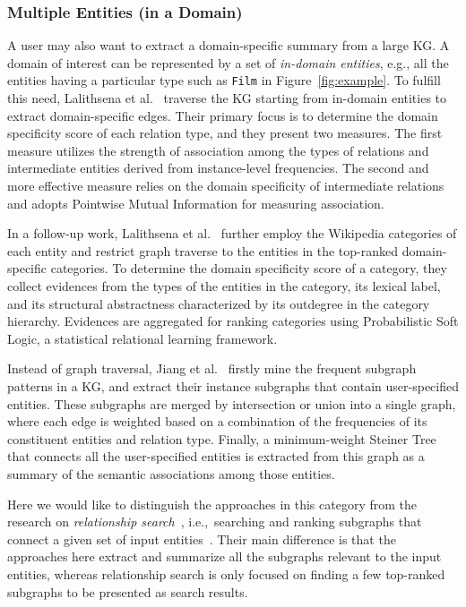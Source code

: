 \subsubsection{Multiple Entities (in a Domain)}
A user may also want to extract a domain-specific summary from a large KG. A domain of interest can be represented by a set of \emph{in-domain entities}, e.g., all the entities having a particular type such as \texttt{Film} in Figure~\ref{fig:example}. To fulfill this need, Lalithsena et al.~ traverse the KG starting from in-domain entities to extract domain-specific edges. Their primary focus is to determine the domain specificity score of each relation type, and they present two measures. The first measure utilizes the strength of association among the types of relations and intermediate entities derived from instance-level frequencies. The second and more effective measure relies on the domain specificity of intermediate relations and adopts Pointwise Mutual Information for measuring association.

In a follow-up work, Lalithsena et al.~ further employ the Wikipedia categories of each entity and restrict graph traverse to the entities in the top-ranked domain-specific categories. To determine the domain specificity score of a category, they collect evidences from the types of the entities in the category, its lexical label, and its structural abstractness characterized by its outdegree in the category hierarchy. Evidences are aggregated for ranking categories using Probabilistic Soft Logic, a statistical relational learning framework.

Instead of graph traversal, Jiang et al.~ firstly mine the frequent subgraph patterns in a KG, and extract their instance subgraphs that contain user-specified entities. These subgraphs are merged by intersection or union into a single graph, where each edge is weighted based on a combination of the frequencies of its constituent entities and relation type. Finally, a minimum-weight Steiner Tree that connects all the user-specified entities is extracted from this graph as a summary of the semantic associations among those entities.

Here we would like to distinguish the approaches in this category from the research on \emph{relationship search}~\cite{DBLP:journals/sigweb/000120}, i.e.,~searching and ranking subgraphs that connect a given set of input entities~\cite{DBLP:journals/tkde/ChengSQ17}.
Their main difference is that the approaches here extract and summarize all the subgraphs relevant to the input entities, whereas relationship search is only focused on finding a few top-ranked subgraphs to be presented as search results.

